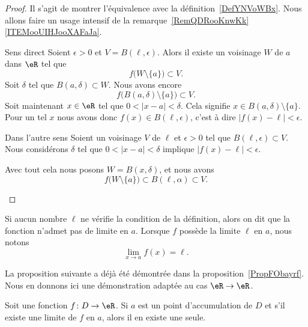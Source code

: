 \begin{proof}
    Il s'agit de montrer l'équivalence avec la définition~\ref{DefYNVoWBx}. Nous allons faire un usage intensif de la remarque~\ref{RemQDRooKnwKk}\ref{ITEMooUIHJooXAFaJa}.
    \begin{subproof}
    \item[Sens direct]
        Soient \( \epsilon>0\) et \( V=B(\ell,\epsilon)\). Alors il existe un voisinage \( W\) de \( a\) dans \( \eR\) tel que
        \begin{equation}
            f\big( W\setminus\{ a \} \big)\subset V.
        \end{equation}
        Soit \( \delta\) tel que \( B(a,\delta)\subset W\). Nous avons encore
        \begin{equation}
            f\big( B(a,\delta)\setminus\{ a \} \big)\subset V.
        \end{equation}
        Soit maintenant \( x\in \eR\) tel que $0<| x-a |<\delta$. Cela signifie \( x\in B(a,\delta)\setminus\{ a \}\). Pour un tel \( x\) nous avons donc \( f(x)\in B(\ell,\epsilon)\), c'est à dire \( | f(x)-\ell |<\epsilon\).
    \item[Dans l'autre sens]
        Soient un voisinage \( V\) de \( \ell\) et \( \epsilon>0\) tel que \( B(\ell,\epsilon)\subset V\). Nous considérons \( \delta\) tel que \( 0<| x-a |<\delta\) implique \( | f(x)-\ell |<\epsilon\).

        Avec tout cela nous posons \( W=B(x,\delta)\), et nous avons
        \begin{equation}
            f\big( W\setminus\{ a \} \big)\subset B(\ell,\alpha)\subset V.
        \end{equation}
    \end{subproof}
\end{proof}

Si aucun nombre $\ell$ ne vérifie la condition de la définition, alors on dit que la fonction n'admet pas de limite en $a$. Lorsque $f$ possède la limite $\ell$ en $a$, nous notons
\begin{equation}
	\lim_{x\to a} f(x)=\ell.
\end{equation}

La proposition suivante a déjà été démontrée dans la proposition~\ref{PropFObayrf}. Nous en donnons ici une démonstration adaptée au cas \( \eR\to \eR\).

\begin{proposition}
	Soit une fonction $f\colon D\to \eR$. Si $a$ est un point d'accumulation de $D$ et s'il existe une limite de $f$ en $a$, alors il en existe une seule.
\end{proposition}


